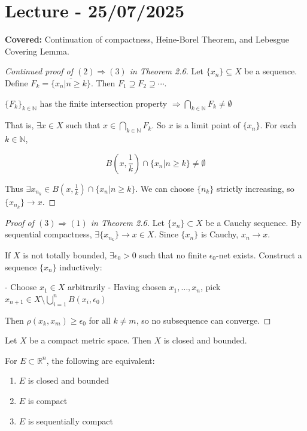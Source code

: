 \documentclass{functionspaces}
\begin{document}
\endgroup


\newpage
\section{Lecture - 25/07/2025}

\textbf{Covered:} Continuation of compactness, Heine-Borel Theorem, and Lebesgue Covering Lemma.

\begingroup
\setlength{\parskip}{6pt}
\setlength{\parindent}{0pt}

\begin{proof}[Continued proof of $(2) \Rightarrow (3)$ in Theorem 2.6]
Let $\{x_n\} \subseteq X$ be a sequence. Define $F_k = \overline{\{x_n | n \geq k\}}$. Then $F_1 \supseteq F_2 \supseteq \cdots$.

$\{F_k\}_{k\in\mathbb{N}}$ has the finite intersection property $\Rightarrow \bigcap_{k\in\mathbb{N}}F_k \neq \emptyset$

That is, $\exists x \in X$ such that $x \in \bigcap_{k\in\mathbb{N}}F_k$. So $x$ is a limit point of $\{x_n\}$. For each $k \in \mathbb{N}$,

\[ B\left(x,\frac{1}{k}\right) \cap \{x_n | n \geq k\} \neq \emptyset \]

Thus $\exists x_{n_k} \in B\left(x,\frac{1}{k}\right) \cap \{x_n | n \geq k\}$. We can choose $\{n_k\}$ strictly increasing, so $\{x_{n_k}\} \to x$.
\end{proof}

\begin{proof}[Proof of $(3) \Rightarrow (1)$ in Theorem 2.6]
Let $\{x_n\} \subset X$ be a Cauchy sequence. By sequential compactness, $\exists \{x_{n_k}\} \to x \in X$. Since $\{x_n\}$ is Cauchy, $x_n \to x$.

If $X$ is not totally bounded, $\exists \epsilon_0 > 0$ such that no finite $\epsilon_0$-net exists. Construct a sequence $\{x_n\}$ inductively:

- Choose $x_1 \in X$ arbitrarily
- Having chosen $x_1, \ldots, x_n$, pick $x_{n+1} \in X \setminus \bigcup_{i=1}^n B(x_i,\epsilon_0)$

Then $\rho(x_k,x_m) \geq \epsilon_0$ for all $k \neq m$, so no subsequence can converge.
\end{proof}

\begin{corollary}
Let $X$ be a compact metric space. Then $X$ is closed and bounded.
\end{corollary}

\begin{corollary}
For $E \subset \mathbb{R}^n$, the following are equivalent:
\begin{enumerate}
\item $E$ is closed and bounded
\item $E$ is compact
\item $E$ is sequentially compact
\end{enumerate}
\end{corollary}
\end{document}
